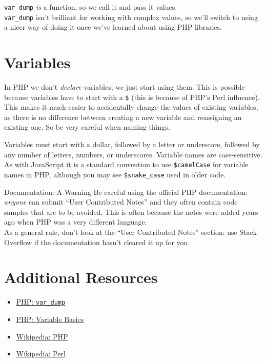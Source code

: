 \texttt{var\_dump} \textit{is} a function, so we call it and pass it values.
\\

\texttt{var\_dump} isn't brilliant for working with complex values, so we'll switch to using a nicer way of doing it once we've learned about using PHP libraries.


\section{Variables}

In PHP we don't \textit{declare} variables, we just start using them. This is possible because variables have to start with a \texttt{\$} (this is because of PHP's Perl influence).
\\

This makes it much easier to accidentally change the values of existing variables, as there is no difference between creating a new variable and reassigning an existing one. So be very careful when naming things.


Variables must start with a dollar, followed by a letter or underscore, followed by any number of letters, numbers, or underscores. Variable names are case-sensitive.
\\

As with JavaScript it is a standard convention to use \texttt{\$camelCase} for variable names in PHP, although you may see \texttt{\$snake\_case} used in older code.


\begin{infobox}{Documentation: A Warning}
    Be careful using the official PHP documentation: \textit{anyone} can submit ``User Contributed Notes'' and they often contain code samples that are to be avoided. This is often because the notes were added years ago when PHP was a very different language.
    \\

    As a general rule, don't look at the ``User Contributed Notes'' section: use Stack Overflow if the documentation hasn't cleared it up for you.
\end{infobox}



\section{Additional Resources}

\begin{itemize}[leftmargin=*]
    \item \href{https://www.php.net/manual/en/function.var-dump.php}{PHP: \texttt{var\_dump}}
    \item \href{http://php.net/manual/en/language.variables.basics.php}{PHP: Variable Basics}
    \item \href{https://en.wikipedia.org/wiki/PHP}{Wikipedia: PHP}
    \item \href{https://en.wikipedia.org/wiki/Perl}{Wikipedia: Perl}
\end{itemize}
